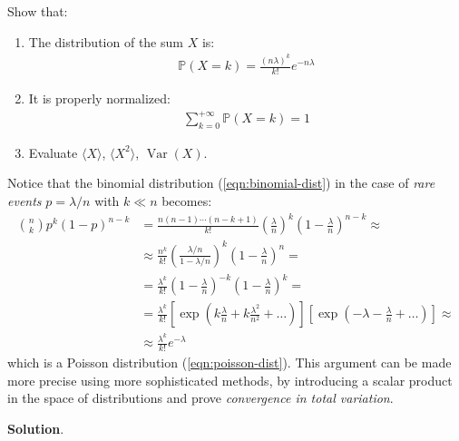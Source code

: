\documentclass[../../main.tex]{subfiles}
\begin{document}
\begin{exo}
\begin{enumerate}[label=\alph*.]
        Show that:
        \begin{enumerate}[label=\roman*.]
            \item The distribution of the sum $X$ is:
            \begin{align*}
                \mathbb{P}(X=k) = \frac{(n \lambda)^k}{k!} e^{-n \lambda} 
            \end{align*}
            \item It is properly normalized:
            \begin{align*}
                \sum_{k=0}^{+\infty} \mathbb{P}(X=k) = 1
            \end{align*}
            \item Evaluate $\langle X \rangle$, $\langle X^2 \rangle$, $\operatorname{Var}(X)$. 
        \end{enumerate}
    \end{enumerate}

    Notice that the binomial distribution (\ref{eqn:binomial-dist}) in the case of \textit{rare events} $p=\lambda/n$ with $k \ll n$ becomes:
    \begin{align*}
        {n\choose k} p^k(1-p)^{n-k} &= \frac{n(n-1)\cdots (n-k+1)}{k!} \left(\frac{\lambda}{n} \right)^k \left(1-\frac{\lambda}{n} \right)^{n-k} \approx\\
        &\approx \frac{n^k}{k!} \left(\frac{\lambda/n}{1 - \lambda/n} \right)^k \left(1-\frac{\lambda}{n} \right)^n =\\
        &= \frac{\lambda^k}{k!}\left(1-\frac{\lambda}{n} \right)^{-k} \left(1-\frac{\lambda}{n} \right)^k =\\
        &=\frac{\lambda^k}{k!}\left[\exp\left(k \frac{\lambda}{n}+k \frac{\lambda^2}{n^2} + \dots \right) \right] \left[\exp\left(-\lambda -\frac{\lambda}{n} + \dots \right)\right] \approx\\
        &\approx \frac{\lambda^k}{k!} e^{-\lambda} 
    \end{align*} 
    which is a Poisson distribution (\ref{eqn:poisson-dist}). This argument can be made more precise using more sophisticated methods, by introducing a scalar product in the space of distributions and prove \textit{convergence in total variation}.
    
    \medskip

    \textbf{Solution}. 
    

\end{exo}
\end{document}
